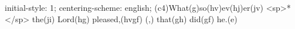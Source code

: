 initial-style: 1;
centering-scheme: english;
(c4)What(g)so(hv)ev(hj)er(jv) <sp>*</sp> the(ji) Lord(hg) pleased,(hvgf) (,) that(gh) did(gf) he.(e)
